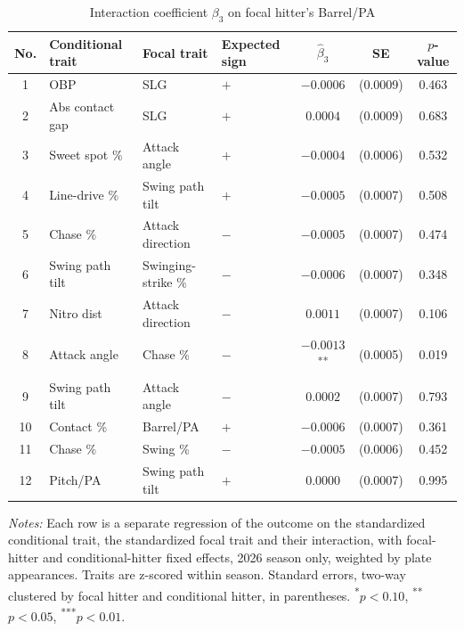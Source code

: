 \begin{table}[htbp]
\centering
\small
\caption{Interaction coefficient $\beta_3$ on focal hitter's Barrel/PA}
\label{tab:table1_barrel_2026}
\begin{tabular}{clllccc}
\toprule
No. & Conditional trait & Focal trait & Expected sign & $\hat\beta_3$ & SE & $p$-value \\
\midrule
1 & OBP & SLG & $+$ & $-0.0006$ & (0.0009) & 0.463 \\
2 & Abs contact gap & SLG & $+$ & $0.0004$ & (0.0009) & 0.683 \\
3 & Sweet spot \% & Attack angle & $+$ & $-0.0004$ & (0.0006) & 0.532 \\
4 & Line-drive \% & Swing path tilt & $+$ & $-0.0005$ & (0.0007) & 0.508 \\
5 & Chase \% & Attack direction & $-$ & $-0.0005$ & (0.0007) & 0.474 \\
6 & Swing path tilt & Swinging-strike \% & $-$ & $-0.0006$ & (0.0007) & 0.348 \\
7 & Nitro dist & Attack direction & $-$ & $0.0011$ & (0.0007) & 0.106 \\
8 & Attack angle & Chase \% & $-$ & $-0.0013$\textsuperscript{**} & (0.0005) & 0.019 \\
9 & Swing path tilt & Attack angle & $-$ & $0.0002$ & (0.0007) & 0.793 \\
10 & Contact \% & Barrel/PA & $+$ & $-0.0006$ & (0.0007) & 0.361 \\
11 & Chase \% & Swing \% & $-$ & $-0.0005$ & (0.0006) & 0.452 \\
12 & Pitch/PA & Swing path tilt & $+$ & $0.0000$ & (0.0007) & 0.995 \\
\bottomrule
\end{tabular}
\par\smallskip\parbox{0.95\textwidth}{\footnotesize \textit{Notes:} Each row is a separate regression of the outcome on the standardized conditional trait, the standardized focal trait and their interaction, with focal-hitter and conditional-hitter fixed effects, 2026 season only, weighted by plate appearances. Traits are z-scored within season. Standard errors, two-way clustered by focal hitter and conditional hitter, in parentheses. \textsuperscript{*}$p<0.10$, \textsuperscript{**}$p<0.05$, \textsuperscript{***}$p<0.01$.}
\end{table}
